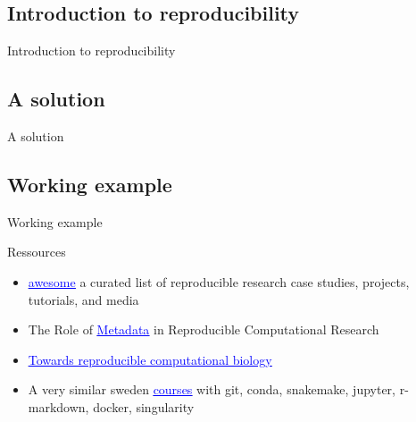 \subsection[IntroRepro]{Introduction to reproducibility}
\begin{frame}
\huge{Introduction to reproducibility}
\end{frame}

\subsection[Solution]{A solution}
\begin{frame}
\huge{A solution}
\end{frame}

\subsection[Example]{Working example}
\begin{frame}
\huge{Working example}
\end{frame}

%

\begin{frame}{Ressources}
\begin{itemize}
    \item \href{https://github.com/leipzig/awesome-reproducible-research}{\textcolor{blue}{\underline{awesome}}} a curated list of reproducible research case studies, projects, tutorials, and media
    \item The Role of \href{https://arxiv.org/pdf/2006.08589.pdf}{\textcolor{blue}{\underline{Metadata}}} in Reproducible Computational Research
    \item \href{https://reproducibility.sschmeier.com}{\textcolor{blue}{\underline{Towards reproducible computational biology}}}
    \item A very similar sweden \href{https://nbis-reproducible-research.readthedocs.io/en/latest/}{\textcolor{blue}{\underline{courses}}} with git, conda, snakemake, jupyter, r-markdown, docker, singularity
\end{itemize}
\end{frame}
